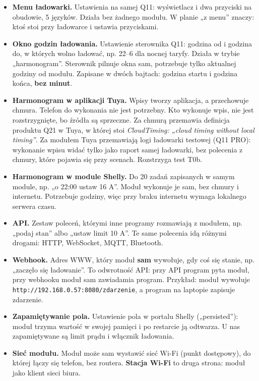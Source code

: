 \documentclass[11pt,a4paper]{article}
\begin{document}
\begin{itemize}
\item \textbf{Menu ładowarki.} Ustawienia na samej Q11: wyświetlacz i dwa przyciski na obudowie, 5 języków. Działa bez żadnego modułu. W planie „z menu” znaczy: ktoś stoi przy ładowarce i ustawia przyciskami.
\item \textbf{Okno godzin ładowania.} Ustawienie sterownika Q11: godzina od i godzina do, w których wolno ładować, np. 22–6 dla nocnej taryfy. Działa w trybie „harmonogram”. Sterownik pilnuje okna sam, potrzebuje tylko aktualnej godziny od modułu. Zapisane w dwóch bajtach: godzina startu i godzina końca, \textbf{bez minut}.
\item \textbf{Harmonogram w aplikacji Tuya.} Wpisy tworzy aplikacja, a przechowuje chmura. Telefon do wykonania nie jest potrzebny. Kto wykonuje wpis, nie jest rozstrzygnięte, bo źródła są sprzeczne. Za chmurą przemawia definicja produktu Q21 w Tuya, w której stoi \emph{CloudTiming: „cloud timing without local timing”}. Za modułem Tuya przemawiają logi ładowarki testowej (Q11 PRO): wykonanie wpisu widać tylko jako raport samej ładowarki, bez polecenia z chmury, które pojawia się przy scenach. Rozstrzyga test T0b.
\item \textbf{Harmonogram w module Shelly.} Do 20 zadań zapisanych w samym module, np. „o 22:00 ustaw 16 A”. Moduł wykonuje je sam, bez chmury i internetu. Potrzebuje godziny, więc przy braku internetu wymaga lokalnego serwera czasu.
\item \textbf{API.} Zestaw poleceń, którymi inne programy rozmawiają z modułem, np. „podaj stan” albo „ustaw limit 10 A”. Te same polecenia idą różnymi drogami: HTTP, WebSocket, MQTT, Bluetooth.
\item \textbf{Webhook.} Adres WWW, który moduł \textbf{sam} wywołuje, gdy coś się stanie, np. „zaczęło się ładowanie”. To odwrotność API: przy API program pyta moduł, przy webhooku moduł sam zawiadamia program. Przykład: moduł wywołuje \texttt{http:\allowbreak{}/\allowbreak{}/\allowbreak{}192.\allowbreak{}168.\allowbreak{}0.\allowbreak{}57:\allowbreak{}8080/\allowbreak{}zdarzenie}, a program na laptopie zapisuje zdarzenie.
\item \textbf{Zapamiętywanie pola.} Ustawienie pola w portalu Shelly („persisted”): moduł trzyma wartość w swojej pamięci i po restarcie ją odtwarza. U nas zapamiętywane są limit prądu i włącznik ładowania.
\item \textbf{Sieć modułu.} Moduł może sam wystawić sieć Wi-Fi (punkt dostępowy), do której łączy się telefon, bez routera. \textbf{Stacja Wi-Fi} to druga strona: moduł jako klient sieci biura.
\end{itemize}
\end{document}
